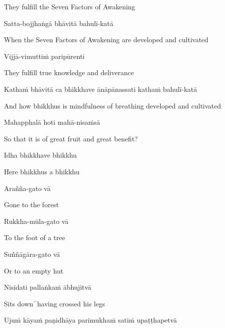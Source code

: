 \begin{cprenglish}
They fulfill the Seven Factors of Awakening
\end{cprenglish}

Satta-bojjhaṅgā bhāvitā bahulī-katā

\begin{cprenglish}
When the Seven Factors of Awakening are developed and cultivated
\end{cprenglish}

Vijjā-vimuttiṁ paripūrenti

\begin{cprenglish}
They fulfill true knowledge and deliverance
\end{cprenglish}

Kathaṁ bhāvitā ca bhikkhave ānāpānassati kathaṁ bahulī-katā

\begin{cprenglish}
And how bhikkhus is mindfulness of breathing developed and cultivated
\end{cprenglish}

Mahapphalā hoti mahā-nisaṁsā

\begin{cprenglish}
So that it is of great fruit and great benefit?
\end{cprenglish}

Idha bhikkhave bhikkhu

\begin{cprenglish}
Here bhikkhus a bhikkhu
\end{cprenglish}

Arañña-gato vā

\begin{cprenglish}
Gone to the forest
\end{cprenglish}

Rukkha-mūla-gato vā

\begin{cprenglish}
To the foot of a tree
\end{cprenglish}

Suññāgāra-gato vā

\begin{cprenglish}
Or to an empty hut
\end{cprenglish}

Nisīdati pallaṅkaṁ ābhujitvā

\begin{cprenglish}
Sits down  ̓  having crossed his legs
\end{cprenglish}

Ujuṁ kāyaṁ paṇidhāya parimukhaṁ satiṁ upaṭṭhapetvā

